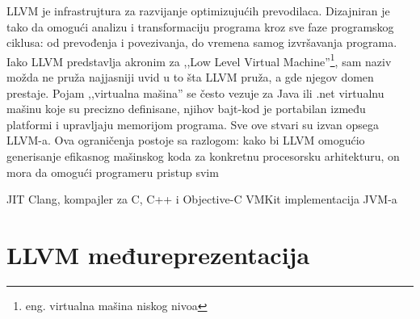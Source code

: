 LLVM je infrastrujtura za razvijanje optimizujućih prevodilaca. Dizajniran je tako da omogući analizu i transformaciju programa kroz sve faze programskog ciklusa: od prevođenja i povezivanja, do vremena samog izvršavanja programa\cite{llvm-cgo04}. Iako LLVM predstavlja akronim za ,,Low Level Virtual Machine''\footnote{eng. virtualna mašina niskog nivoa}, sam naziv možda ne pruža najjasniji uvid u to šta LLVM pruža, a gde njegov domen prestaje. Pojam ,,virtualna mašina'' se često vezuje za Java ili .net virtualnu mašinu koje su precizno definisane, njihov bajt-kod je portabilan između platformi i upravljaju memorijom programa. Sve ove stvari su izvan opsega LLVM-a. Ova ograničenja postoje sa razlogom: kako bi LLVM omogućio generisanje efikasnog mašinskog koda za konkretnu procesorsku arhitekturu, on mora da omogući programeru pristup svim 

JIT
Clang, kompajler za C, C++ i Objective-C
VMKit implementacija JVM-a


\section{LLVM međureprezentacija}



